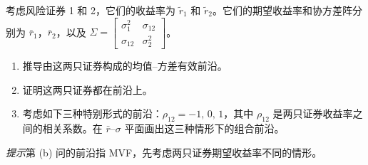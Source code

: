 \par\noindent\begin{minipage}{\linewidth}
\begin{problem}
 考虑风险证券 1 和 2，它们的收益率为 $\tilde{r}_{1}$ 和 $\tilde{r}_{2}$。它们的期望收益率和协方差阵分别为 $\bar{r}_{1}$，$\bar{r}_{2}$，以及 $\Sigma=\begin{bmatrix}\sigma_{1}^{2} & \sigma_{12} \\ \sigma_{12} & \sigma_{2}^{2}\end{bmatrix}$。
\begin{enumerate}[label=(\alph*)]
    \item 推导由这两只证券构成的均值--方差有效前沿。
    \item 证明这两只证券都在前沿上。
    \item 考虑如下三种特别形式的前沿：$\rho_{12}=-1,\,0,\,1$，其中 $\rho_{12}$ 是两只证券收益率之间的相关系数。在 $\bar{r}$--$\sigma$ 平面画出这三种情形下的组合前沿。
\end{enumerate}
\par\textit{提示}\quad 第 (b) 问的前沿指 MVF，先考虑两只证券期望收益率不同的情形。
\end{problem}
\end{minipage}\par
{}
